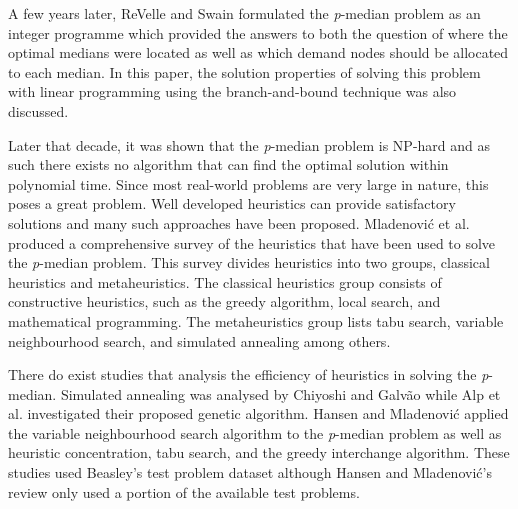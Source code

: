 \documentclass[11pt]{article}
\begin{document}
	A few years later, ReVelle and Swain \cite{REVE70} formulated the \emph{p}-median problem as an integer programme  which provided the answers to both the question of where the optimal medians were located as well as which demand nodes should be allocated to each median.  In this paper, the solution properties of solving this problem with linear programming  using the branch-and-bound technique  was also discussed.
	
	Later that decade, it was shown that the \emph{p}-median problem is NP-hard  and as such there exists no algorithm that can find the optimal solution within polynomial time.  Since most real-world problems are very large in nature, this poses a great problem.  Well developed heuristics can provide satisfactory solutions and many such approaches have been proposed.  Mladenovi\'{c} et al. \cite{MLAD07} produced a comprehensive survey of the heuristics that have been used to solve the \emph{p}-median problem.  This survey divides heuristics into two groups, classical heuristics and metaheuristics.  The classical heuristics group consists of constructive heuristics, such as the greedy algorithm, local search, and mathematical programming.  The metaheuristics group lists tabu search, variable neighbourhood search, and simulated annealing among others.
	
	There do exist studies that analysis the efficiency of heuristics in solving the \emph{p}-median.  Simulated annealing was analysed by Chiyoshi  and Galv\~{a}o  \cite{CHIY00} while Alp et al. \cite{ALPO03} investigated their proposed genetic algorithm.  Hansen and Mladenovi\'{c} \cite{HANS01} applied the variable neighbourhood search algorithm to the \emph{p}-median problem as well as heuristic concentration, tabu search, and the greedy interchange algorithm.  These studies used Beasley's test problem dataset although Hansen  and Mladenovi\'{c}'s review only used a portion of the available test problems.  
	
\end{document}
